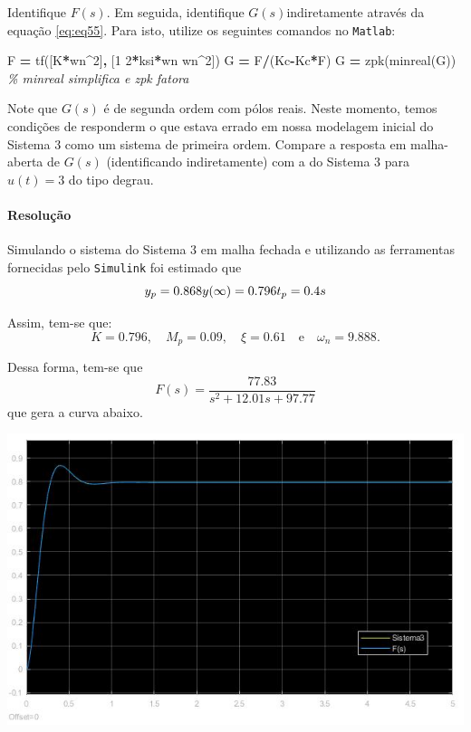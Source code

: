 \documentclass[
]{book}
\newenvironment{Shaded}{\begin{snugshade}}{\end{snugshade}}
\newcommand{\CommentTok}[1]{\textcolor[rgb]{0.56,0.35,0.01}{\textit{#1}}}
\newcommand{\FloatTok}[1]{\textcolor[rgb]{0.00,0.00,0.81}{#1}}
\newcommand{\NormalTok}[1]{#1}
\newcommand{\OperatorTok}[1]{\textcolor[rgb]{0.81,0.36,0.00}{\textbf{#1}}}
\newcommand{\VariableTok}[1]{\textcolor[rgb]{0.00,0.00,0.00}{#1}}
\begin{document}
Identifique \(F(s)\). Em seguida, identifique \(G(s)\)indiretamente através da equação \eqref{eq:eq55}. Para isto, utilize os seguintes comandos no \texttt{Matlab}:

\begin{Shaded}
\begin{Highlighting}[]
\VariableTok{F} \OperatorTok{=} \VariableTok{tf}\NormalTok{([}\VariableTok{K}\OperatorTok{*}\VariableTok{wn}\OperatorTok{\^{}}\FloatTok{2}\NormalTok{]}\OperatorTok{,}\NormalTok{ [}\FloatTok{1} \FloatTok{2}\OperatorTok{*}\VariableTok{ksi}\OperatorTok{*}\VariableTok{wn} \VariableTok{wn}\OperatorTok{\^{}}\FloatTok{2}\NormalTok{])}
\VariableTok{G} \OperatorTok{=} \VariableTok{F}\OperatorTok{/}\NormalTok{(}\VariableTok{Kc}\OperatorTok{{-}}\VariableTok{Kc}\OperatorTok{*}\VariableTok{F}\NormalTok{)}
\VariableTok{G} \OperatorTok{=} \VariableTok{zpk}\NormalTok{(}\VariableTok{minreal}\NormalTok{(}\VariableTok{G}\NormalTok{)) }\CommentTok{\% minreal simplifica e zpk fatora}
\end{Highlighting}
\end{Shaded}

Note que \(G(s)\) é de segunda ordem com pólos reais. Neste momento, temos condições de responderm o que estava errado em nossa modelagem inicial do Sistema 3 como um sistema de primeira ordem. Compare a resposta em malha-aberta de \(G(s)\) (identificando indiretamente) com a do Sistema 3 para \(u(t) = 3\) do tipo degrau.

\hypertarget{resoluuxe7uxe3o-9}{%
\paragraph*{Resolução}\label{resoluuxe7uxe3o-9}}

Simulando o sistema do Sistema 3 em malha fechada e utilizando as ferramentas fornecidas pelo \texttt{Simulink} foi estimado que
\[
y_p = 0.868 \\
y(\infty) = 0.796 \\
t_p = 0.4s
\]

Assim, tem-se que:
\[
K = 0.796, \quad M_p = 0.09, \quad \xi = 0.61 \quad \text{e} \quad \omega_n= 9.888.
\]

Dessa forma, tem-se que
\[
F(s) = \frac {77.83}{s^2+ 12.01s +97.77}
\]
que gera a curva abaixo.

\includegraphics{Imagens/Lab3/Resolução/prob3BA.jpg}
\end{document}
